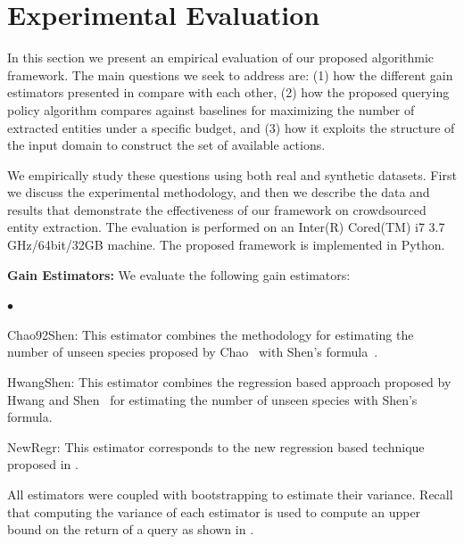 \documentclass{vldb}
\newcommand{\squishlist}{
   \begin{list}{$\bullet$}
    {
      \setlength{\itemsep}{0pt}
      \setlength{\parsep}{3pt}
      \setlength{\topsep}{3pt}
      \setlength{\partopsep}{0pt}
      \setlength{\leftmargin}{1.5em}
      \setlength{\labelwidth}{1em}
      \setlength{\labelsep}{0.5em} } }
\newcommand{\squishend}{
    \end{list}  }
\begin{document}
\section{Experimental Evaluation}
\label{sec:exps}
In this section we present an empirical evaluation of our proposed algorithmic framework. The main questions we seek to address are: (1) how the different gain estimators presented in  compare with each other, (2) how the proposed querying policy algorithm compares against baselines for maximizing the number of extracted entities under a specific budget, and (3) how it exploits the structure of the input domain to construct the set of available actions. 

We empirically study these questions using both real and synthetic datasets. First we discuss the experimental methodology, and then we describe the data and results that demonstrate the effectiveness of our framework on crowdsourced entity extraction. The evaluation is performed on an Inter(R) Cored(TM) i7 3.7 GHz/64bit/32GB machine. The proposed framework is implemented in Python. 

\vspace{5pt}\noindent\textbf{Gain Estimators:} We evaluate the following gain estimators:
\squishlist
\item Chao92Shen: This estimator combines the methodology for estimating the number of unseen species proposed by Chao~\cite{chao:1992} with Shen's formula~.
\item HwangShen: This estimator combines the regression based approach proposed by Hwang and Shen~\cite{hwang:2010} for estimating the number of unseen species with Shen's formula. 
\item NewRegr: This estimator corresponds to the new regression based technique proposed in .
\squishend
All estimators were coupled with bootstrapping to estimate their variance. Recall that computing the variance of each estimator is used to compute an upper bound on the return of a query as shown in .
\end{document}
